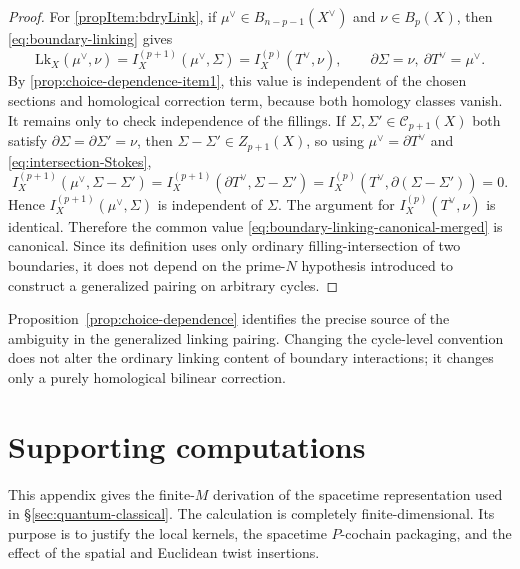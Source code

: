 \documentclass[dvipsnames,a4paper]{article}
\numberwithin{equation}{section}
\theoremstyle{definition}
\theoremstyle{remark}
\newcommand{\Lk}{\mathrm{Lk}}
\begin{document}
\begin{proof}
	For \ref{propItem:bdryLink}, if
	\(\mu^\vee\in B_{n-p-1}(X^\vee)\) and \(\nu\in B_p(X)\), then
	\eqref{eq:boundary-linking} gives
	\begin{equation}
		\Lk_X(\mu^\vee,\nu)
		=
		I_X^{(p+1)}\left(\mu^\vee,\Sigma\right)
		=
		I_X^{(p)}\left(T^\vee,\nu\right),
		\qquad
		\partial\Sigma=\nu,\ \partial T^\vee=\mu^\vee.
	\end{equation}
	By \ref{prop:choice-dependence-item1}, this value is independent of the chosen
	sections and homological correction term, because both homology classes vanish.
	It remains only to check independence of the fillings. If
	\(\Sigma,\Sigma'\in\mathcal C_{p+1}(X)\) both satisfy
	\(\partial\Sigma=\partial\Sigma'=\nu\), then \(\Sigma-\Sigma'\in Z_{p+1}(X)\), so
	using \(\mu^\vee=\partial T^\vee\) and \eqref{eq:intersection-Stokes},
	\begin{equation}
		I_X^{(p+1)}\left(\mu^\vee,\Sigma-\Sigma'\right)
		=
		I_X^{(p+1)}\left(\partial T^\vee,\Sigma-\Sigma'\right)
		=
		I_X^{(p)}\left(T^\vee,\partial(\Sigma-\Sigma')\right)
		=
		0.
	\end{equation}
	Hence \(I_X^{(p+1)}(\mu^\vee,\Sigma)\) is independent of \(\Sigma\). The argument for
	\(I_X^{(p)}(T^\vee,\nu)\) is identical. Therefore the common value
	\eqref{eq:boundary-linking-canonical-merged} is canonical. Since its definition uses
	only ordinary filling-intersection of two boundaries, it does not depend on the
	prime-\(N\) hypothesis introduced to construct a generalized pairing on arbitrary
	cycles.
\end{proof}

Proposition~\ref{prop:choice-dependence} identifies the precise source of the ambiguity in
the generalized linking pairing. Changing the cycle-level convention does not alter the
ordinary linking content of boundary interactions; it changes only a purely homological
bilinear correction.







\section{Supporting computations}
\label{app:computeTr}

This appendix gives the finite-\(M\) derivation of the spacetime representation used in
\S\ref{sec:quantum-classical}.  The calculation is completely finite-dimensional.
Its purpose is to justify the local kernels, the spacetime \(P\)-cochain packaging, and the
effect of the spatial and Euclidean twist insertions.
\end{document}
